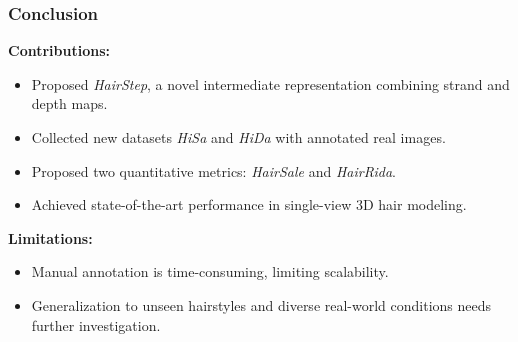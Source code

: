 
\begin{frame}[t]
    \frametitle{Conclusion}
    \textbf{Contributions:}
    \begin{itemize}
        \item Proposed \emph{HairStep}, a novel intermediate representation combining strand and depth maps.
        \item Collected new datasets \emph{HiSa} and \emph{HiDa} with annotated real images.
        \item Proposed two quantitative metrics: \emph{HairSale} and \emph{HairRida}.
        \item Achieved state-of-the-art performance in single-view 3D hair modeling.
    \end{itemize}
    \vspace{1em}
    \textbf{Limitations:}
    \begin{itemize}
        \item Manual annotation is time-consuming, limiting scalability.
        \item Generalization to unseen hairstyles and diverse real-world conditions needs further investigation.
    \end{itemize}
\end{frame}